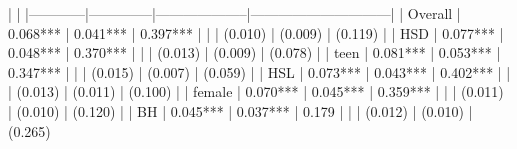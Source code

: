 |            | %
|------------|--------------|--------------------|------------------------------|
| Overall    | 0.068***     | 0.041***           | 0.397***                     |
|            | (0.010)      | (0.009)            | (0.119)                      |
| HSD        | 0.077***     | 0.048***           | 0.370***                     |
|            | (0.013)      | (0.009)            | (0.078)                      |
| teen       | 0.081***     | 0.053***           | 0.347***                     |
|            | (0.015)      | (0.007)            | (0.059)                      |
| HSL        | 0.073***     | 0.043***           | 0.402***                     |
|            | (0.013)      | (0.011)            | (0.100)                      |
| female     | 0.070***     | 0.045***           | 0.359***                     |
|            | (0.011)      | (0.010)            | (0.120)                      |
| BH         | 0.045***     | 0.037***           | 0.179                        |
|            | (0.012)      | (0.010)            | (0.265)
